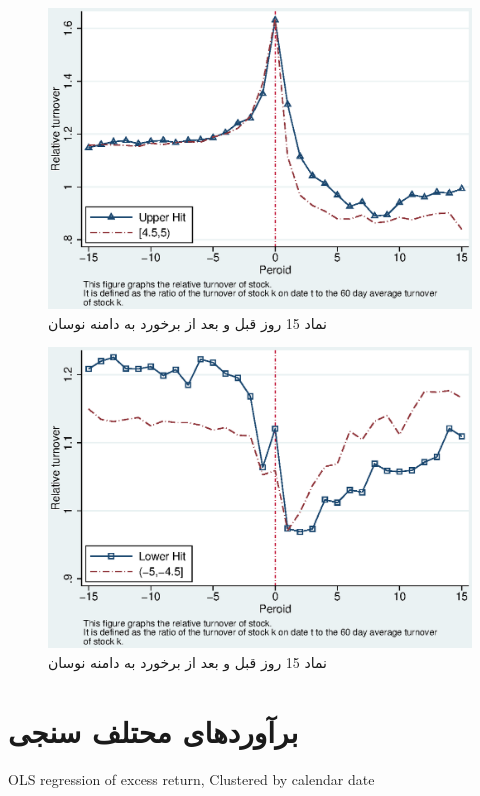 \documentclass[12pt]{article}
\begin{document}
\begin{appendices}
\begin{figure}[htbp]
\centering
\includegraphics[width=0.8\columnwidth]{CURT.eps}
\caption{ نماد 15 روز قبل و بعد از برخورد به دامنه نوسان}
\label{g28}
\end{figure}
\begin{figure}[htbp]
\centering
\includegraphics[width=0.8\columnwidth]{CLRT.eps}
\caption{ نماد 15 روز قبل و بعد از برخورد به دامنه نوسان}
\label{g29}
\end{figure}



\FloatBarrier

\section{برآورد‌های محتلف سنجی}
\begin{LTR}
\begin{table}[htbp]
\centering
\lr{}
\caption{OLS regression of excess return, Clustered by calendar date}
\label{t4}
\end{table}


\end{LTR}
\end{appendices}
\end{document}
